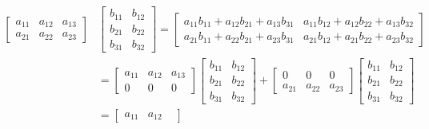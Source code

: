 \documentclass[../main.tex]{subfiles}
\begin{document}
\begin{align*}
\begin{bmatrix}
    \scriptstyle a_{11} &
    \scriptstyle a_{12} &
    \scriptstyle a_{13} \\
    \scriptstyle a_{21} &
    \scriptstyle a_{22} &
    \scriptstyle a_{23}
\end{bmatrix}
&\begin{bmatrix}
    \scriptstyle b_{11} &
    \scriptstyle b_{12} \\
    \scriptstyle b_{21} &
    \scriptstyle b_{22} \\
    \scriptstyle b_{31} &
    \scriptstyle b_{32}
\end{bmatrix}
=
\begin{bmatrix}
    \scriptstyle a_{11} b_{11} + a_{12} b_{21} + a_{13} b_{31} &
    \scriptstyle a_{11} b_{12} + a_{12} b_{22} + a_{13} b_{32} \\
    \scriptstyle a_{21} b_{11} + a_{22} b_{21} + a_{23} b_{31} &
    \scriptstyle a_{21} b_{12} + a_{21} b_{22} + a_{23} b_{32}
\end{bmatrix} \\
&=
\begin{bmatrix}
    \scriptstyle a_{11} &
    \scriptstyle a_{12} &
    \scriptstyle a_{13} \\
    \scriptstyle 0      &
    \scriptstyle 0      &
    \scriptstyle 0
\end{bmatrix}
\begin{bmatrix}
    \scriptstyle b_{11} &
    \scriptstyle b_{12} \\
    \scriptstyle b_{21} &
    \scriptstyle b_{22} \\
    \scriptstyle b_{31} &
    \scriptstyle b_{32}
\end{bmatrix}
+
\begin{bmatrix}
    \scriptstyle 0      &
    \scriptstyle 0      &
    \scriptstyle 0 \\
    \scriptstyle a_{21} &
    \scriptstyle a_{22} &
    \scriptstyle a_{23}
\end{bmatrix}
\begin{bmatrix}
    \scriptstyle b_{11} & \scriptstyle b_{12} \\
    \scriptstyle b_{21} & \scriptstyle b_{22} \\
    \scriptstyle b_{31} & \scriptstyle b_{32}
\end{bmatrix} \\
&=
\begin{bmatrix}
    \scriptstyle a_{11} &
    \scriptstyle a_{12} &

\end{bmatrix}
\end{align*}
\end{document}

